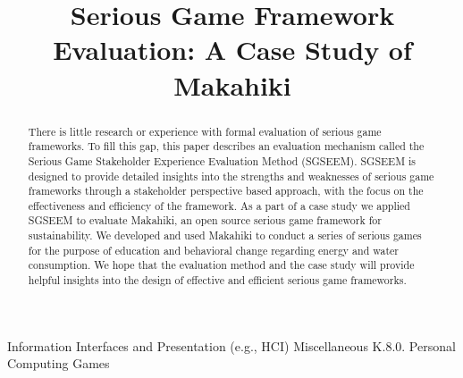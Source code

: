 \documentclass{sigchi}
\begin{document}
\title{Serious Game Framework Evaluation: A Case Study of Makahiki}


\maketitle

\begin{abstract}
There is little research or experience with formal evaluation of
serious game frameworks. To fill this gap, this paper describes
an evaluation mechanism called the Serious Game Stakeholder Experience Evaluation Method (SGSEEM). SGSEEM is designed to provide detailed insights
into the strengths and weaknesses of serious game frameworks through a
stakeholder perspective based approach, with the focus on the
effectiveness and efficiency of the framework. As a part of a case
study we applied SGSEEM to evaluate Makahiki, an open
source serious game framework for sustainability.  We developed and
used Makahiki to conduct a series of serious games for the purpose of
education and behavioral change regarding energy and water
consumption. We hope that the evaluation method and the case study
will provide helpful insights into the design of effective and
efficient serious game frameworks.

\end{abstract}


 {Information Interfaces and Presentation (e.g., HCI)} {Miscellaneous} {K.8.0.} {Personal Computing} {Games}

\end{document}
